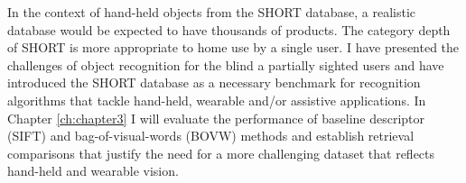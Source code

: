 In the context of hand-held objects from the SHORT database, a realistic database would be expected to have thousands of products. The category depth of SHORT is more appropriate to home use by a single user. I have presented the challenges of object recognition for the blind a partially sighted users and have introduced the SHORT database as a necessary benchmark for recognition algorithms that tackle hand-held, wearable and/or assistive applications. In Chapter \ref{ch:chapter3} I will evaluate the performance of baseline descriptor (SIFT) and bag-of-visual-words (BOVW) methods and establish retrieval comparisons that justify the need for a more challenging dataset that reflects hand-held and wearable vision.





